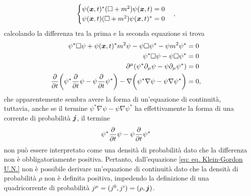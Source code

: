\begin{equation}
    \begin{cases}
        \psi(\bm{x},t)^*(\square+m^2)\psi(\bm{x},t)=0 \\
        \psi(\bm{x},t)(\square+m^2)\psi(\bm{x},t)^*=0
    \end{cases},
\end{equation}
calcolando la differenza tra la prima e la seconda equazione si trova
\begin{equation}
    \begin{split}
        \psi^*\square\psi + \psi(\bm{x},t)^*m^2\psi - \psi\square\psi^* - \psi m^2\psi^* &= 0 \\
        \psi^*\square\psi - \psi\square\psi^* &= 0 \\
        \partial^\mu(\psi^*\partial_\mu\psi - \psi\partial_\mu\psi^*) &= 0 \\
        \frac{\partial}{\partial t}\bigg(\psi^*\frac{\partial}{\partial t}\psi - \psi\frac{\partial}{\partial t}\psi^*\bigg) - \nabla\bigg(\psi^*\nabla\psi - \psi\nabla\psi^*\bigg) &= 0, \\
    \end{split}
\end{equation}
che apparentemente sembra avere la forma di un'equazione di continuità, tuttavia, anche se il termine $\psi^*\nabla\psi - \psi\nabla\psi^*$ ha effettivamente la forma di una corrente di probabilità $\bm{j}$, il termine 
\begin{equation}
    \psi^*\frac{\partial}{\partial t}\psi - \psi\frac{\partial}{\partial t}\psi^*
\end{equation}
non può essere interpretato come una densità di probabilità dato che la differenza non è obbligatoriamente positiva. Pertanto, dall'equazione \eqref{eq: eq. Klein-Gordon U.N.} non è possibile derivare un'equazione di continuità dato che la densità di probabilità $\rho$ non è definita positiva, impedendo la definizione di una quadricorrente di probabilità $j^\mu = (j^0,j^i) = (\rho,\bm{j})$.
